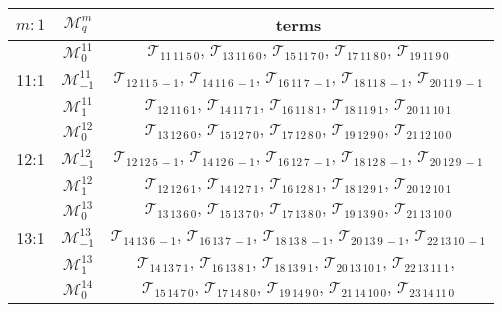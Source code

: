 \documentclass[12pt,reqno]{amsart}
\numberwithin{equation}{section}
\begin{document}
\begin{table}[h]
\begin{tabular}{|c|c|c|}
  \hline
  $m:1$ & $\mathcal{M}^m_q$ & terms \\
  \hline
   & $\mathcal{M}^{1\!1}_0$ & $\mathcal{T}_{1\!1\,1\!1\,5\,0},\, \mathcal{T}_{1\!3\,1\!1\,6\,0},\, \mathcal{T}_{1\!5\,1\!1\,7\,0},\, \mathcal{T}_{1\!7\,1\!1\,8\,0},\, \mathcal{T}_{1\!9\,1\!1\,9\,0}$ \\
  11:1 & $\mathcal{M}^{1\!1}_{-1}$ & $\mathcal{T}_{1\!2\,1\!1\,5\,-1},\, \mathcal{T}_{1\!4\,1\!1\,6\,-1},\, \mathcal{T}_{1\!6\,1\!1\,7\,-1},\, \mathcal{T}_{1\!8\,1\!1\,8\,-1},\, \mathcal{T}_{2\!0\,1\!1\,9\,-1}$ \\
   & $\mathcal{M}^{1\!1}_1$ & $\mathcal{T}_{1\!2\,1\!1\,6\,1},\, \mathcal{T}_{1\!4\,1\!1\,7\,1},\, \mathcal{T}_{1\!6\,1\!1\,8\,1},\, \mathcal{T}_{1\!8\,1\!1\,9\,1},\, \mathcal{T}_{2\!0\,1\!1\,1\!0\,1}$ \\
    \hline
   & $\mathcal{M}^{1\!2}_0$ & $\mathcal{T}_{1\!3\,1\!2\,6\,0},\, \mathcal{T}_{1\!5\,1\!2\,7\,0},\, \mathcal{T}_{1\!7\,1\!2\,8\,0},\, \mathcal{T}_{1\!9\,1\!2\,9\,0},\, \mathcal{T}_{2\!1\,1\!2\,1\!0\,0}$ \\
  12:1 & $\mathcal{M}^{1\!2}_{-1}$ & $\mathcal{T}_{1\!2\,1\!2\,5\,-1},\, \mathcal{T}_{1\!4\,1\!2\,6\,-1},\, \mathcal{T}_{1\!6\,1\!2\,7\,-1},\, \mathcal{T}_{1\!8\,1\!2\,8\,-1},\, \mathcal{T}_{2\!0\,1\!2\,9\,-1}$ \\
   & $\mathcal{M}^{1\!2}_1$ & $\mathcal{T}_{1\!2\,1\!2\,6\,1},\, \mathcal{T}_{1\!4\,1\!2\,7\,1},\, \mathcal{T}_{1\!6\,1\!2\,8\,1},\, \mathcal{T}_{1\!8\,1\!2\,9\,1},\, \mathcal{T}_{2\!0\,1\!2\,1\!0\,1}$ \\
    \hline
 & $\mathcal{M}^{1\!3}_0$ & $\mathcal{T}_{1\!3\,1\!3\,6\,0},\, \mathcal{T}_{1\!5\,1\!3\,7\,0},\, \mathcal{T}_{1\!7\,1\!3\,8\,0},\, \mathcal{T}_{1\!9\,1\!3\,9\,0},\, \mathcal{T}_{2\!1\,1\!3\,1\!0\,0}$ \\
  13:1 & $\mathcal{M}^{1\!3}_{-1}$ & $ \mathcal{T}_{1\!4\,1\!3\,6\,-1},\, \mathcal{T}_{1\!6\,1\!3\,7\,-1},\, \mathcal{T}_{1\!8\,1\!3\,8\,-1},\, \mathcal{T}_{2\!0\,1\!3\,9\,-1},\, \mathcal{T}_{2\!2\,1\!3\,1\!0\,-1}$ \\
   & $\mathcal{M}^{1\!3}_1$ & $ \mathcal{T}_{1\!4\,1\!3\,7\,1},\, \mathcal{T}_{1\!6\,1\!3\,8\,1},\, \mathcal{T}_{1\!8\,1\!3\,9\,1},\, \mathcal{T}_{2\!0\,1\!3\,1\!0\,1},\, \mathcal{T}_{2\!2\,1\!3\,1\!1\,1},\,$ \\
  \hline
  & $\mathcal{M}^{1\!4}_0$ & $ \mathcal{T}_{1\!5\,1\!4\,7\,0},\, \mathcal{T}_{1\!7\,1\!4\,8\,0},\, \mathcal{T}_{1\!9\,1\!4\,9\,0},\, \mathcal{T}_{2\!1\,1\!4\,1\!0\,0},\, \mathcal{T}_{2\!3\,1\!4\,1\!1\,0}$ \\

\end{tabular}
\end{table}
\end{document}
